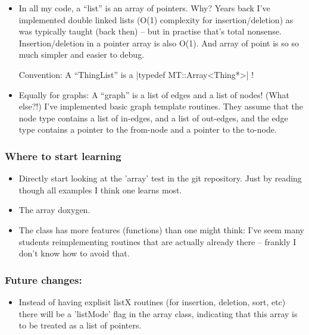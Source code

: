 \begin{itemize}
\item In all my code, a ``list'' is an array of pointers. Why? Years back
   I've implemented double linked lists (O(1) complexity for
   insertion/deletion) as was typically taught (back then) -- but in
   practise that's total nonsense. Insertion/deletion in a pointer
   array is also O(1). And array of point is so so much simpler and
   easier to debug.

   Convention: A ``ThingList'' is a |typedef MT::Array<Thing*>| !

\item Equally for graphs: A ``graph'' is a list of edges and a list of
   nodes! (What else?!) I've implemented basic graph template
   routines. They assume that the node type contains a list of
   in-edges, and a list of out-edges, and the edge type contains a
   pointer to the from-node and a pointer to the to-node.
\end{itemize}

\subsubsection{Where to start learning}

\begin{itemize}
\item Directly start looking at the 'array' test in the git
repository. Just by reading though all examples I think one learns
most.

\item The array doxygen.

\item The class has more features (functions) than one might think: I've
seem many students reimplementing routines that are actually already
there -- frankly I don't know how to avoid that.
\end{itemize}


\subsubsection{Future changes:}

\begin{itemize}
\item Instead of having explisit listX routines (for insertion, deletion,
   sort, etc) there will be a 'listMode' flag in the array class,
   indicating that this array is to be treated as a list of pointers.
\end{itemize}

